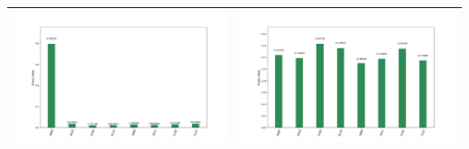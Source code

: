 \begin{landscape}
\begin{table}[ht]
\begin{tabular}{c c}
        \includegraphics[scale=0.32]{Grover_results/Grover_n=3,m=11.png} & \includegraphics[scale=0.32]{Grover_results/Grover_n=3,m=12.png} \\ \hline
    \end{tabular}
\end{table}
\end{landscape}

